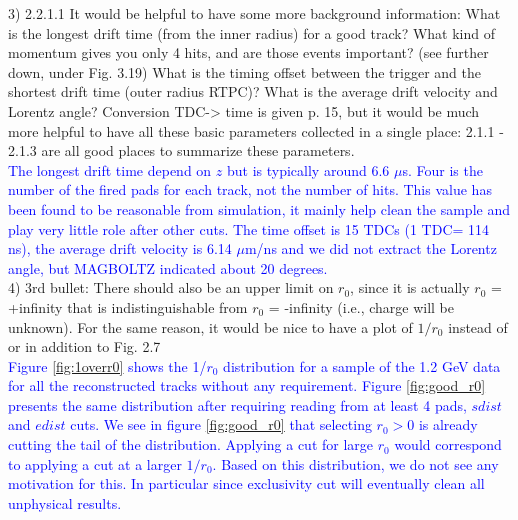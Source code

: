 3) 2.2.1.1 It would be helpful to have some more background information: What 
is the longest drift time (from the inner radius) for a good track? What kind 
of momentum gives you only 4 hits, and are those events important? (see further 
down, under Fig. 3.19) What is the timing offset between the trigger and the 
shortest drift time (outer radius RTPC)? What is the average drift velocity and 
Lorentz angle? Conversion TDC-> time is given p. 15, but it would be much more 
helpful to have all these basic parameters collected in a single place: 2.1.1 - 
2.1.3 are all good places to summarize these parameters.\\
\textcolor{blue}{
  The longest drift time depend on $z$ but is typically around 6.6 $\mu$s. 
  Four is the number of the fired pads for each track, not the number of hits.  
  This value has been found to be reasonable from simulation, it mainly help 
  clean the sample and play very little role after other cuts. The time offset 
  is 15 TDCs (1 TDC= 114 ns), the average drift velocity is 6.14 $\mu$m/ns and 
  we did not extract the Lorentz angle, but MAGBOLTZ indicated about 20 
  degrees.}\\

4) 3rd bullet: There should also be an upper limit on $r_0$, since it is 
actually $r_0$ = +infinity that is indistinguishable from $r_0$ = -infinity 
(i.e., charge will be unknown). For the same reason, it would be nice to have a 
plot of $1/r_0$ instead of or in addition to Fig. 2.7 \\
\textcolor{blue}{Figure \ref{fig:1overr0} shows the 1/$r_0$
   distribution for a sample of the 1.2 GeV data for all the reconstructed 
   tracks without any requirement. Figure \ref{fig:good_r0} presents the same 
   distribution after requiring reading from at least 4 pads, $sdist$ and 
   $edist$ cuts. We see in figure \ref{fig:good_r0} that selecting 
   $r_0>0$ is already cutting the tail of the distribution. Applying a cut for 
   large $r_0$ would correspond to applying a cut at a larger $1/r_0$. Based on this
   distribution, we do not see any motivation for this. In particular since exclusivity
   cut will eventually clean all unphysical results.}\\

